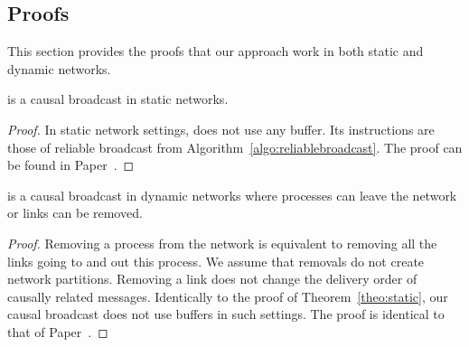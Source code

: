 \subsection{Proofs}

This section provides the proofs that our approach work in both static and
dynamic networks.

\begin{theorem}
  \CBROADCAST is a causal broadcast in static networks.
\end{theorem}

\begin{proof}
  In static network settings, \CBROADCAST does not use any buffer. Its
  instructions are those of reliable broadcast from
  Algorithm~\ref{algo:reliablebroadcast}. The proof can be found in
  Paper~\cite{friedman2004causal}.
\end{proof}

\begin{lemma}
  \CBROADCAST is a causal broadcast in dynamic networks where processes can
  leave the network or links can be removed.
\end{lemma}

\begin{proof}
  Removing a process from the network is equivalent to removing all the links
  going to and out this process. We assume that removals do not create network
  partitions.  Removing a link does not change the delivery order of causally
  related messages. Identically to the proof of Theorem~\ref{theo:static}, our
  causal broadcast does not use buffers in such settings. The proof is identical
  to that of Paper~\cite{friedman2004causal}.
\end{proof}


%     

